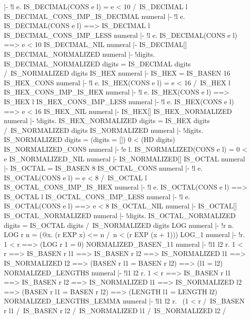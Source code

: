 |- !l e. IS_DECIMAL(CONS e l) = e < 10 /\ IS_DECIMAL l
\ENDTHEOREM
\THEOREM IS\_DECIMAL\_CONS\_IMP\_IS\_DECIMAL numeral
|- !l e. IS_DECIMAL(CONS e l) ==> IS_DECIMAL l
\ENDTHEOREM
\THEOREM IS\_DECIMAL\_CONS\_IMP\_LESS numeral
|- !l e. IS_DECIMAL(CONS e l) ==> e < 10
\ENDTHEOREM
\THEOREM IS\_DECIMAL\_NIL numeral
|- IS_DECIMAL[]
\ENDTHEOREM
\THEOREM IS\_DECIMAL\_NORMALIZED numeral
|- !digits.
    IS_DECIMAL_NORMALIZED digits =
    IS_DECIMAL digits /\ IS_NORMALIZED digits
\ENDTHEOREM
\THEOREM IS\_HEX numeral
|- IS_HEX = IS_BASEN 16
\ENDTHEOREM
\THEOREM IS\_HEX\_CONS numeral
|- !l e. IS_HEX(CONS e l) = e < 16 /\ IS_HEX l
\ENDTHEOREM
\THEOREM IS\_HEX\_CONS\_IMP\_IS\_HEX numeral
|- !l e. IS_HEX(CONS e l) ==> IS_HEX l
\ENDTHEOREM
\THEOREM IS\_HEX\_CONS\_IMP\_LESS numeral
|- !l e. IS_HEX(CONS e l) ==> e < 16
\ENDTHEOREM
\THEOREM IS\_HEX\_NIL numeral
|- IS_HEX[]
\ENDTHEOREM
\THEOREM IS\_HEX\_NORMALIZED numeral
|- !digits.
    IS_HEX_NORMALIZED digits = IS_HEX digits /\ IS_NORMALIZED digits
\ENDTHEOREM
\THEOREM IS\_NORMALIZED numeral
|- !digits. IS_NORMALIZED digits = (digits = []) \/ 0 < (HD digits)
\ENDTHEOREM
\THEOREM IS\_NORMALIZED\_CONS numeral
|- !e l. IS_NORMALIZED(CONS e l) = 0 < e
\ENDTHEOREM
\THEOREM IS\_NORMALIZED\_NIL numeral
|- IS_NORMALIZED[]
\ENDTHEOREM
\THEOREM IS\_OCTAL numeral
|- IS_OCTAL = IS_BASEN 8
\ENDTHEOREM
\THEOREM IS\_OCTAL\_CONS numeral
|- !l e. IS_OCTAL(CONS e l) = e < 8 /\ IS_OCTAL l
\ENDTHEOREM
\THEOREM IS\_OCTAL\_CONS\_IMP\_IS\_HEX numeral
|- !l e. IS_OCTAL(CONS e l) ==> IS_OCTAL l
\ENDTHEOREM
\THEOREM IS\_OCTAL\_CONS\_IMP\_LESS numeral
|- !l e. IS_OCTAL(CONS e l) ==> e < 8
\ENDTHEOREM
\THEOREM IS\_OCTAL\_NIL numeral
|- IS_OCTAL[]
\ENDTHEOREM
\THEOREM IS\_OCTAL\_NORMALIZED numeral
|- !digits.
    IS_OCTAL_NORMALIZED digits = IS_OCTAL digits /\ IS_NORMALIZED digits
\ENDTHEOREM
\THEOREM LOG numeral
|- !r n. LOG r n = (@x. (r EXP x) <= n /\ n < (r EXP (x + 1)))
\ENDTHEOREM
\THEOREM LOG\_1 numeral
|- !r. 1 < r ==> (LOG r 1 = 0)
\ENDTHEOREM
\THEOREM NORMALIZED\_BASEN\_11 numeral
|- !l1 l2 r.
    1 < r ==>
    IS_BASEN r l1 ==>
    IS_BASEN r l2 ==>
    IS_NORMALIZED l1 ==>
    IS_NORMALIZED l2 ==>
    (BASEN r l1 = BASEN r l2) ==>
    (l1 = l2)
\ENDTHEOREM
\THEOREM NORMALIZED\_LENGTHS numeral
|- !l1 l2 r.
    1 < r ==>
    IS_BASEN r l1 ==>
    IS_BASEN r l2 ==>
    IS_NORMALIZED l1 ==>
    IS_NORMALIZED l2 ==>
    (BASEN r l1 = BASEN r l2) ==>
    (LENGTH l1 = LENGTH l2)
\ENDTHEOREM
\THEOREM NORMALIZED\_LENGTHS\_LEMMA numeral
|- !l1 l2 r.
    ~(1 < r /\
      IS_BASEN r l1 /\
      IS_BASEN r l2 /\
      IS_NORMALIZED l1 /\
      IS_NORMALIZED l2 /\
